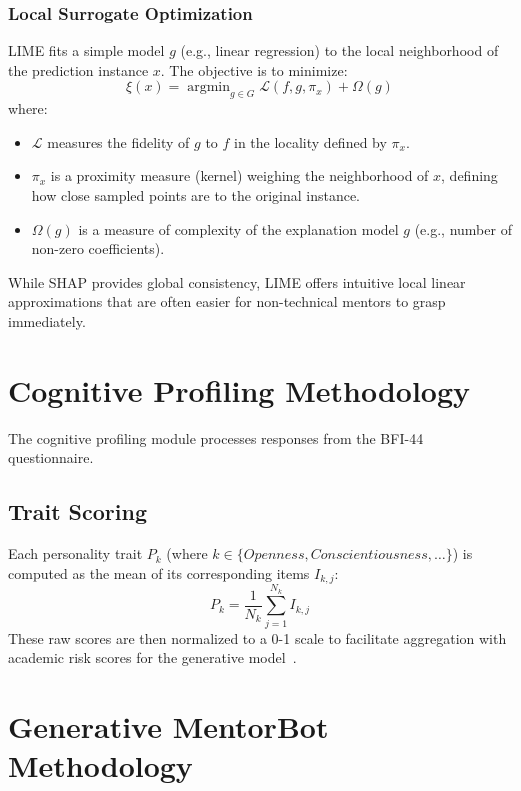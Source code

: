 \documentclass[12pt,a4paper]{report}
\begin{document}
\subsubsection{Local Surrogate Optimization}
LIME fits a simple model $g$ (e.g., linear regression) to the local neighborhood of the prediction instance $x$. The objective is to minimize:
\begin{equation}
\xi(x) = \operatorname{argmin}_{g \in G} \mathcal{L}(f, g, \pi_x) + \Omega(g)
\label{eq:lime_objective}
\end{equation}
where:
\begin{itemize}
    \item $\mathcal{L}$ measures the fidelity of $g$ to $f$ in the locality defined by $\pi_x$.
    \item $\pi_x$ is a proximity measure (kernel) weighing the neighborhood of $x$, defining how close sampled points are to the original instance.
    \item $\Omega(g)$ is a measure of complexity of the explanation model $g$ (e.g., number of non-zero coefficients).
\end{itemize}
While SHAP provides global consistency, LIME offers intuitive local linear approximations that are often easier for non-technical mentors to grasp immediately.

\section{Cognitive Profiling Methodology}

The cognitive profiling module processes responses from the BFI-44 questionnaire.

\subsection{Trait Scoring}
Each personality trait $P_k$ (where $k \in \{Openness, Conscientiousness, \dots\}$) is computed as the mean of its corresponding items $I_{k,j}$:
\begin{equation}
P_k = \frac{1}{N_k} \sum_{j=1}^{N_k} I_{k,j}
\label{eq:bfi_trait}
\end{equation}
These raw scores are then normalized to a 0-1 scale to facilitate aggregation with academic risk scores for the generative model~\cite{mccrae1992bigfive}.

\section{Generative MentorBot Methodology}
\end{document}
